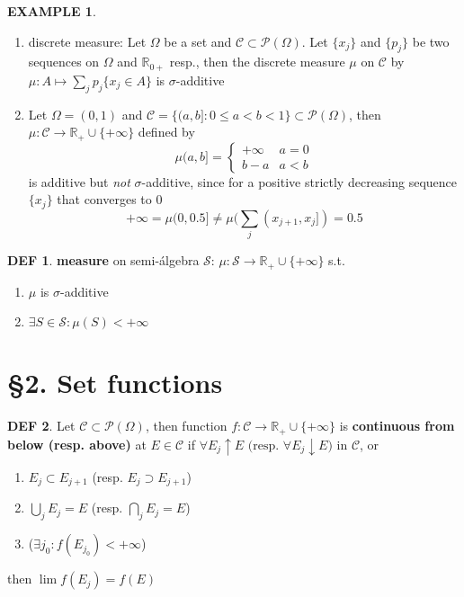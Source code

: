 \documentclass[hidelinks]{article}
\theoremstyle{definition}
\newtheorem*{defin}{DEF}
\newtheorem*{eg}{EXAMPLE}
\theoremstyle{dotless}
\theoremstyle{remark}
\begin{document}
\begin{eg}~
\begin{enumerate}[label=\arabic*\degree]
    \item discrete measure: Let $\Omega$ be a set and $\mathscr{C}\subset\mathscr{P}(\Omega)$. Let $\{x_j\}$ and $\{p_j\}$ be two sequences on $\Omega$ and $\mathbb{R}_{0+}$ resp., then the discrete measure $\mu$ on $\mathscr{C}$ by $\mu:A\mapsto\sum_jp_j\{x_j\in A\}$ is $\sigma$-additive
    \item Let $\Omega=(0,1)$ and $\mathscr{C}=\{(a,b]:0\leq a<b<1\}\subset\mathscr{P}(\Omega)$, then $\mu:\mathscr{C}\to\mathbb{R}_+\cup\{+\infty\}$ defined by
    \[\mu(a,b]=
    \begin{cases} 
      +\infty & a=0 \\
      b-a & a<b
   \end{cases}
\]
is additive but \emph{not} $\sigma$-additive, since for a positive strictly decreasing sequence $\{x_j\}$ that converges to 0
\[+\infty=\mu(0,0.5]\neq\mu(\sum_j(x_{j+1},x_j])=0.5\]
\end{enumerate}
\end{eg}

\begin{defin}
\textbf{measure} on semi-álgebra $\mathscr{S}$: $\mu:\mathscr{S}\to\mathbb{R}_+\cup\{+\infty\}$ s.t. \begin{enumerate}[label=\arabic*\degree]
    \item $\mu$ is $\sigma$-additive 
    \item $\exists S\in\mathscr{S}:\mu(S)<+\infty$
\end{enumerate}
\end{defin}

\newpage
\section*{\S2. Set functions}
\setcounter{section}{2}

\begin{defin}
Let $\mathscr{C}\subset\mathscr{P}(\Omega)$, then function $f:\mathscr{C}\to\mathbb{R}_+\cup\{+\infty\}$ is \textbf{continuous from below (resp. above)} at $E\in\mathscr{C}$ if $\forall E_j\uparrow E\textrm{ (resp. }\forall E_j\downarrow E)$ in $\mathscr{C}$, or
\begin{enumerate}[label=\arabic*\degree]
    \item $E_j\subset E_{j+1}$ (resp. $E_j\supset E_{j+1}$)
    \item $\bigcup\limits_jE_j=E$ (resp. $\bigcap\limits_jE_j=E$)
    \item ($\exists j_0:f(E_{j_0})<+\infty$)
\end{enumerate}
then $\lim f(E_j)=f(E)$
\end{defin}
\end{document}
